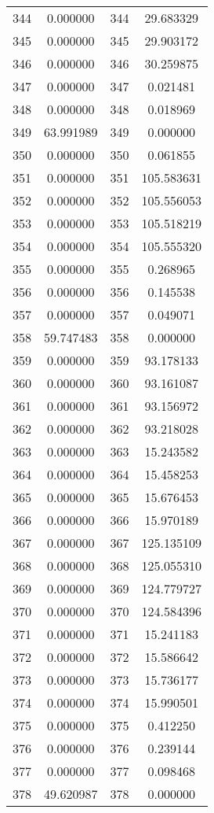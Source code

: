 \documentclass[12pt]{article}
\begin{document}
\begin{longtable}{@{}cccc@{}}
344 & 0.000000 & 344 & 29.683329 \\
345 & 0.000000 & 345 & 29.903172 \\
346 & 0.000000 & 346 & 30.259875 \\
347 & 0.000000 & 347 & 0.021481 \\
348 & 0.000000 & 348 & 0.018969 \\
349 & 63.991989 & 349 & 0.000000 \\
350 & 0.000000 & 350 & 0.061855 \\
351 & 0.000000 & 351 & 105.583631 \\
352 & 0.000000 & 352 & 105.556053 \\
353 & 0.000000 & 353 & 105.518219 \\
354 & 0.000000 & 354 & 105.555320 \\
355 & 0.000000 & 355 & 0.268965 \\
356 & 0.000000 & 356 & 0.145538 \\
357 & 0.000000 & 357 & 0.049071 \\
358 & 59.747483 & 358 & 0.000000 \\
359 & 0.000000 & 359 & 93.178133 \\
360 & 0.000000 & 360 & 93.161087 \\
361 & 0.000000 & 361 & 93.156972 \\
362 & 0.000000 & 362 & 93.218028 \\
363 & 0.000000 & 363 & 15.243582 \\
364 & 0.000000 & 364 & 15.458253 \\
365 & 0.000000 & 365 & 15.676453 \\
366 & 0.000000 & 366 & 15.970189 \\
367 & 0.000000 & 367 & 125.135109 \\
368 & 0.000000 & 368 & 125.055310 \\
369 & 0.000000 & 369 & 124.779727 \\
370 & 0.000000 & 370 & 124.584396 \\
371 & 0.000000 & 371 & 15.241183 \\
372 & 0.000000 & 372 & 15.586642 \\
373 & 0.000000 & 373 & 15.736177 \\
374 & 0.000000 & 374 & 15.990501 \\
375 & 0.000000 & 375 & 0.412250 \\
376 & 0.000000 & 376 & 0.239144 \\
377 & 0.000000 & 377 & 0.098468 \\
378 & 49.620987 & 378 & 0.000000 \\

\end{longtable}
\end{document}
